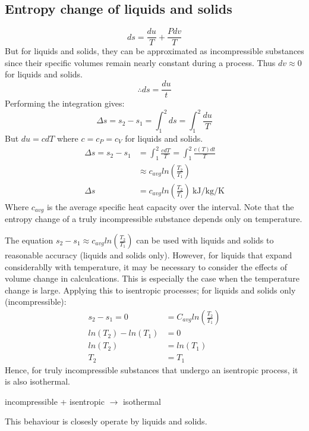 \subsection{Entropy change of liquids and solids}
\begin{equation}
  ds = \frac{du}{T} + \frac{Pdv}{T}
\end{equation}
But for liquids and solids, they can be approximated as incompressible substances since their specific volumes remain nearly constant during a process. Thus \(dv \approx 0 \) for liquids and solids.
\begin{equation}
  \therefore ds = \frac{du}{t}
\end{equation}
Performing the integration gives:
\begin{equation}
  \Delta s = s_2 - s_1 = \int_1^2 ds = \int_1^2 \frac{du}{T}
\end{equation}
But \(du = cdT\) where \( c = c_P = c_V\) for liquids and solids.
\begin{align}
  \Delta s = s_2 - s_1 & = \int_1^2 \frac{cdT}{T} = \int_1^2 \frac{c(T)dt}{T}               \\
                       & \approx c_{avg} ln(\frac{T_2}{T_1})                                \\
  \Delta s             & = c_{avg} ln(\frac{T_2}{T_1}) \ \si{\kilo\joule\per\kg\per\kelvin}
\end{align}
Where \(c_{avg}\) is the average specific heat capacity over the interval. Note that the entropy change of a truly incompressible substance depends only on temperature.

The equation \( s_2 - s_1 \approx c_{avg} ln(\frac{T_2}{T_1}) \) can be used with liquids and solids to reasonable accuracy (liquids and solids only). However, for liquids that expand considerablly with temperature, it may be necessary to consider the effects of volume change in calculcations. This is especially the case when the temperature change is large. Applying this to isentropic processes; for liquids and solids only (incompressible):
\begin{align}
  s_2 - s_1 = 0     & = C_{avg} ln(\frac{T_2}{T_1}) \\
  ln(T_2) - ln(T_1) & = 0                           \\
  ln(T_2)           & = ln(T_1)                     \\
  T_2               & = T_1
\end{align}
Hence, for truly incompressible substances that undergo an isentropic process, it is also isothermal.
\begin{center}
  incompressible + isentropic \(\rightarrow\) isothermal
\end{center}
This behaviour is closesly operate by liquids and solids.
